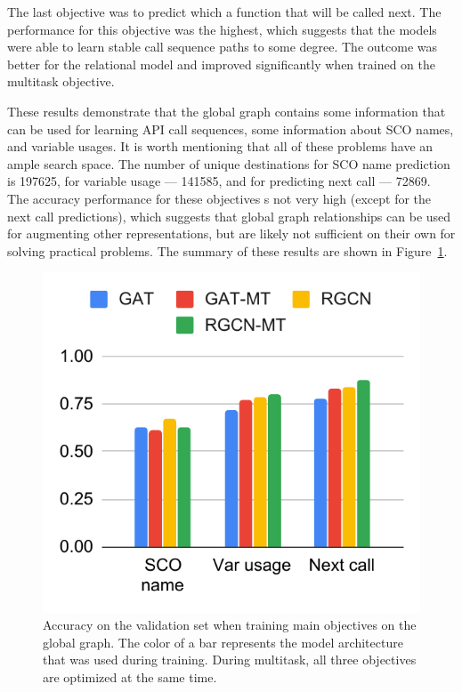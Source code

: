 \documentclass[a4paper,twoside]{article}
\begin{document}
The last objective was to predict which a function that will be called next. The performance for this objective was the highest, which suggests that the models were able to learn stable call sequence paths to some degree. The outcome was better for the relational model and improved significantly when trained on the multitask objective. 

These results demonstrate that the global graph contains some information that can be used for learning API call sequences, some information about SCO names, and variable usages. It is worth mentioning that all of these problems have an ample search space. The number of unique destinations for SCO name prediction is 197625, for variable usage --- 141585, and for predicting next call --- 72869. The accuracy performance for these objectives s not very high (except for the next call predictions), which suggests that global graph relationships can be used for augmenting other representations, but are likely not sufficient on their own for solving practical problems. The summary of these results are shown in Figure~\ref{fig:main_obj}.

\begin{figure}[]
    \centering
    \includegraphics[width=\columnwidth]{main_objective.pdf}
    \caption{Accuracy on the validation set when training main objectives on the global graph. The color of a bar represents the model architecture that was used during training. During multitask, all three objectives are optimized at the same time.}\label{fig:main_obj}
\end{figure}
\end{document}
